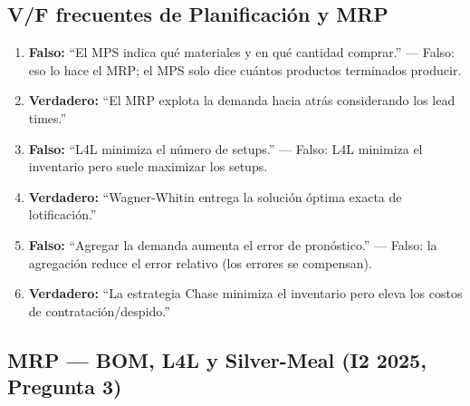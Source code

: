 \subsection{V/F frecuentes de Planificación y MRP}
\begin{enumerate}[label=\textbf{\arabic*.}]
  \item \textbf{Falso:} ``El MPS indica qué materiales y en qué cantidad comprar.'' — Falso: eso lo hace el MRP; el MPS solo dice cuántos productos terminados producir.
  \item \textbf{Verdadero:} ``El MRP explota la demanda hacia atrás considerando los lead times.''
  \item \textbf{Falso:} ``L4L minimiza el número de setups.'' — Falso: L4L minimiza el inventario pero suele maximizar los setups.
  \item \textbf{Verdadero:} ``Wagner-Whitin entrega la solución óptima exacta de lotificación.''
  \item \textbf{Falso:} ``Agregar la demanda aumenta el error de pronóstico.'' — Falso: la agregación reduce el error relativo (los errores se compensan).
  \item \textbf{Verdadero:} ``La estrategia Chase minimiza el inventario pero eleva los costos de contratación/despido.''
\end{enumerate}

\subsection{MRP — BOM, L4L y Silver-Meal (I2 2025, Pregunta 3)}

